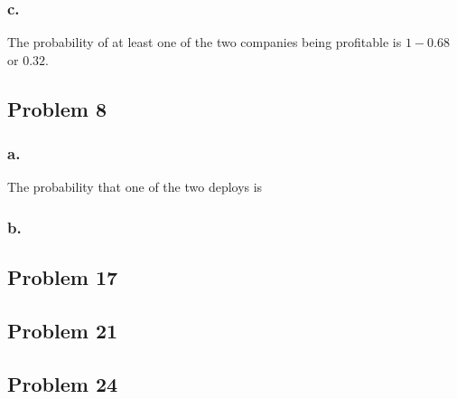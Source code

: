\documentclass[11pt]{article}
\begin{document}
\subsubsection*{c.}
The probability of at least one of the two companies being profitable is 
$1 - 0.68$ or $0.32$. 

\subsection*{Problem 8}
\subsubsection*{a.}
The probability that one of the two deploys is 

\subsubsection*{b.}


\subsection*{Problem 17}

\subsection*{Problem 21}

\subsection*{Problem 24}
\end{document}
